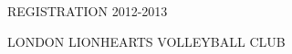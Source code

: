 % 
% 
% 
% 
% 
% 
%
\usepackage{graphicx}
\usepackage{lmodern}
\usepackage{multirow}
\usepackage{wasysym}
\usepackage[cm]{fullpage}
\usepackage[T1]{fontenc}
\setlength{\textheight}{800pt}
\usepackage{ulem}
\usepackage{etoolbox}
\usepackage[british]{babel}

\graphicspath{{\datapath/} {\gpath/}}

\sffamily
\thispagestyle{empty}
\begin{center}


REGISTRATION 2012-2013

LONDON LIONHEARTS VOLLEYBALL CLUB

\end{center}

